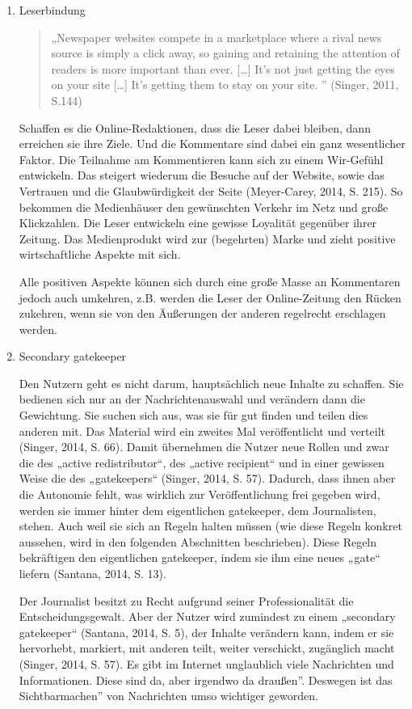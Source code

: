 \begin{enumerate}
\item{Leserbindung}

\begin{quote}
„Newspaper websites compete in a marketplace where a rival news source is simply
a click away, so gaining and retaining the attention of readers is more
important than ever. [\ldots] It’s not just getting the eyes on your site
[\ldots] It’s getting them to stay on your site. ” (Singer, 2011, S.144)
\end{quote}

Schaffen es die Online-Redaktionen, dass die Leser dabei bleiben, dann erreichen
sie ihre Ziele. Und die Kommentare sind dabei ein ganz wesentlicher Faktor. Die
Teilnahme am Kommentieren kann sich zu einem Wir-Gefühl entwickeln. Das steigert
wiederum die Besuche auf der Website, sowie das Vertrauen und die
Glaubwürdigkeit der Seite (Meyer-Carey, 2014, S. 215). So bekommen die
Medienhäuser den gewünschten Verkehr im Netz und große Klickzahlen. Die Leser
entwickeln eine gewisse Loyalität gegenüber ihrer Zeitung. Das Medienprodukt
wird zur (begehrten) Marke und zieht positive wirtschaftliche Aspekte mit sich.

Alle positiven Aspekte können sich durch eine große Masse an Kommentaren jedoch
auch umkehren, z.B. werden die Leser der Online-Zeitung den Rücken zukehren,
wenn sie von den Äußerungen der anderen regelrecht erschlagen werden.


\item{Secondary gatekeeper}


Den Nutzern geht es nicht darum, hauptsächlich neue Inhalte zu schaffen. Sie
bedienen sich nur an der Nachrichtenauswahl und verändern dann die Gewichtung. 
Sie suchen sich aus, was sie für gut finden und teilen dies anderen mit. Das Material wird
ein zweites Mal veröffentlicht und verteilt (Singer, 2014, S. 66).
Damit übernehmen die Nutzer neue Rollen und zwar die des „active redistributor“, des
„active recipient“ und in einer gewissen Weise die des „gatekeepers“ (Singer,
2014, S. 57). Dadurch, dass ihnen aber die Autonomie fehlt, was wirklich zur
Veröffentlichung frei gegeben wird, werden sie immer hinter dem eigentlichen
gatekeeper, dem Journalisten, stehen. Auch weil sie sich an Regeln halten müssen
(wie diese Regeln konkret aussehen, wird in den folgenden Abschnitten
beschrieben). Diese Regeln bekräftigen den eigentlichen gatekeeper, indem sie
ihm eine neues „gate“ liefern (Santana, 2014, S. 13).

Der Journalist besitzt zu Recht aufgrund seiner Professionalität die
Entscheidungsgewalt. Aber der Nutzer wird zumindest zu einem „secondary
gatekeeper“ (Santana, 2014, S. 5), der Inhalte verändern kann, indem er sie
hervorhebt, markiert, mit anderen teilt, weiter verschickt, zugänglich
macht (Singer, 2014, S. 57). 
Es gibt im Internet unglaublich viele Nachrichten und Informationen. Diese sind da,
aber irgendwo \glqq da draußen''. Deswegen ist das \glqq Sichtbarmachen'' von Nachrichten
umso wichtiger geworden. 


\end{enumerate}
